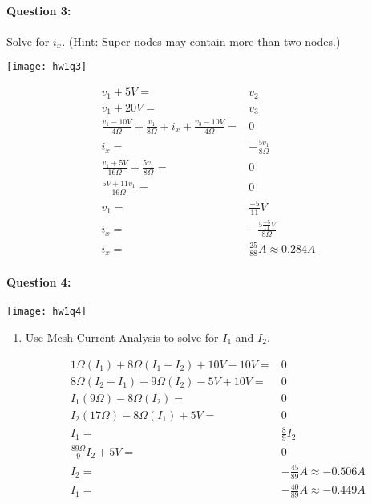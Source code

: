 \documentclass[12pt,letterpaper,titlepage]{article}
\begin{document}
\begin{raggedright}
\clearpage

\paragraph{Question 3: }

Solve for $i_x$. (Hint: Super nodes may contain more than two nodes.)

\begin{center}
\texttt{[image: hw1q3]}
\end{center}

\begin{align*}
    v_1 + 5V=& v_2
\\  v_1 + 20V=& v_3
\\  \frac{v_1 - 10V}{4\Omega} + \frac{v_1}{8\Omega} + i_x + \frac{v_3-10V}{4\Omega}=& 0
\\  i_x=& -\frac{5v_1}{8\Omega}
\\  \frac{v_1+5V}{16\Omega} + \frac{5v_1}{8\Omega} =& 0
\\  \frac{5V + 11v_1}{16\Omega} =& 0
\\  v_1 =& \frac{-5}{11}V
\\  i_x=& -\frac{5\frac{-5}{11}V}{8\Omega}
\\  i_x=& \frac{25}{88}A \approx 0.284A
\end{align*}

\clearpage

\paragraph{Question 4: }

\begin{center}
\texttt{[image: hw1q4]}
\end{center}

\begin{enumerate}[label=\Alph*)]
\item Use Mesh Current Analysis to solve for $I_1$ and $I_2$.

\begin{align*}
    1\Omega(I_1) + 8\Omega(I_1-I_2) + 10V - 10V =& 0
\\  8\Omega(I_2-I_1) + 9\Omega(I_2) - 5V + 10V =& 0
\\  I_1(9\Omega)-8\Omega(I_2) =& 0
\\  I_2(17\Omega) - 8\Omega(I_1) + 5V =& 0
\\  I_1 =& \frac{8}{9}I_2
\\  \frac{89\Omega}{9}I_2 + 5V =& 0
\\  I_2 =& -\frac{45}{89}A \approx -0.506A
\\  I_1 =& -\frac{40}{89}A \approx -0.449A
\end{align*}


\end{enumerate}
\end{raggedright}
\end{document}
